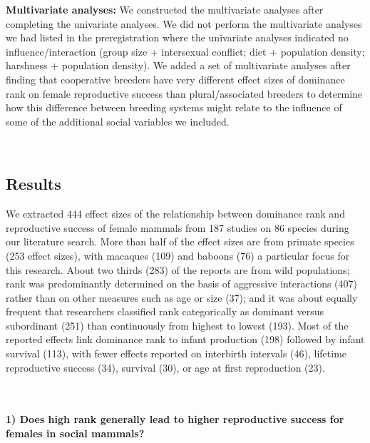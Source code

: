 \documentclass[
]{article}
\begin{document}
\textbf{Multivariate analyses:} We constructed the multivariate analyses
after completing the univariate analyses. We did not perform the
multivariate analyses we had listed in the preregistration where the
univariate analyses indicated no influence/interaction (group size +
intersexual conflict; diet + population density; harshness + population
density). We added a set of multivariate analyses after finding that
cooperative breeders have very different effect sizes of dominance rank
on female reproductive success than plural/associated breeders to
determine how this difference between breeding systems might relate to
the influence of some of the additional social variables we included.

~

\hypertarget{results}{%
\subsection{Results}\label{results}}

We extracted 444 effect sizes of the relationship between dominance rank
and reproductive success of female mammals from 187 studies on 86
species during our literature search. More than half of the effect sizes
are from primate species (253 effect sizes), with macaques (109) and
baboons (76) a particular focus for this research. About two thirds
(283) of the reports are from wild populations; rank was predominantly
determined on the basis of aggressive interactions (407) rather than on
other measures such as age or size (37); and it was about equally
frequent that researchers classified rank categorically as dominant
versus subordinant (251) than continuously from highest to lowest (193).
Most of the reported effects link dominance rank to infant production
(198) followed by infant survival (113), with fewer effects reported on
interbirth intervals (46), lifetime reproductive success (34), survival
(30), or age at first reproduction (23).

~

\hypertarget{does-high-rank-generally-lead-to-higher-reproductive-success-for-females-in-social-mammals-2}{%
\paragraph{\texorpdfstring{\textbf{1) Does high rank generally lead to
higher reproductive success for females in social
mammals?}}{1) Does high rank generally lead to higher reproductive success for females in social mammals?}}\label{does-high-rank-generally-lead-to-higher-reproductive-success-for-females-in-social-mammals-2}}
\end{document}
